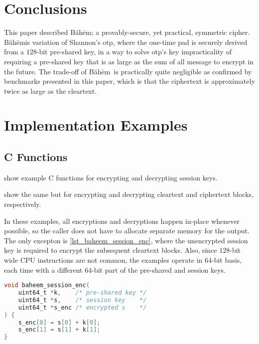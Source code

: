 \documentclass[twocolumn,hidelinks]{article}
\newcommand{\baheem}{Băhēm}
\begin{document}
\section{Conclusions}

This paper described \baheem; a provably-secure, yet practical, symmetric
cipher.  \baheem is variation of Shannon's \gls{otp}, where the one-time
pad is securely derived from a $128$-bit pre-shared key, in a way to solve
\gls{otp}'s key impracticality of requiring a pre-shared key that is as
large as the sum of all message to encrypt in the future.  The trade-off of
\baheem\ is practically quite negligible as confirmed by benchmarks
presented in this paper, which is that the ciphertext is approximately
twice as large as the cleartext.




\vfill
\break

\appendix
\section{Implementation Examples}
\subsection{C Functions}
 show example C
functions for encrypting and decrypting session keys.

 show the same but for
encrypting and decrypting cleartext and ciphertext blocks, respectively.

In these examples, all encryptions and decryptions happen in-place whenever
possible, so the caller does not have to allocate separate memory for the
output.  The only excepton is \cref{lst_baheem_session_enc}, where the
unencrypted session key is required to encrypt the subsequent cleartext
blocks. Also, since $128$-bit wide CPU instructions are not common, the
examples operate in $64$-bit basis, each time with a different $64$-bit
part of the pre-shared and session keys.

\begin{lstlisting}[language=C, caption=Session key encryption function
                   example., label=lst_baheem_session_enc]
void baheem_session_enc(
    uint64_t *k,    /* pre-shared key */
    uint64_t *s,    /* session key    */
    uint64_t *s_enc /* encrypted s    */
) {
    s_enc[0] = s[0] + k[0];
    s_enc[1] = s[1] + k[1];
}
\end{lstlisting}
\end{document}
